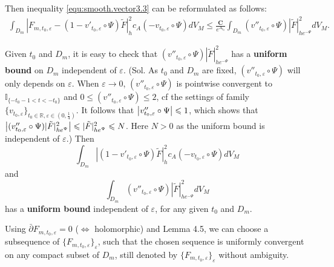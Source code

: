 Then inequality \ref{equ:smooth.vector3.3} can be reformulated
as follows:
\begin{equation}
\label{equ:smooth.vector3.5}
\begin{split}
\int_{D_m}|F_{m,t_{0},\varepsilon}-(1-v'_{t_{0},\varepsilon}\circ\Psi)
\tilde{F}|^{2}_{h}c_{A}(-v_{t_0,\varepsilon}\circ\Psi)dV_{M}
\leqslant\frac{\mathbf{C}}{e^{A_{t_0}}}\int_{D_m}(v''_{t_0,\varepsilon}\circ\Psi)|\tilde{F}|^{2}_{he^{-\Psi}}dV_{M}.
\end{split}
\end{equation}

{\color{purple} Given $t_0$ and $D_{m}$, it is easy to check that
$(v''_{t_0,\varepsilon}\circ\Psi)|\tilde{F}|^{2}_{he^{-\Psi}}$ has a
\textbf{uniform bound} on $D_{m}$ independent of $\varepsilon$. (Sol. As $t_0$ and $D_m$ are fixed, $(v''_{t_0,\varepsilon}\circ\Psi)$ will only depends on $\varepsilon$. When $\varepsilon\to 0$, $(v''_{t_0,\varepsilon}\circ\Psi)$ is pointwise convergent to $\mathbb{I}_{\{-t_0-1<t<-t_0\}}$ and $0\leqslant (v''_{t_0,\varepsilon}\circ\Psi)\leqslant 2$, cf the settings of family $\{v_{t_0,\varepsilon}\}_{t_0\in \mathbb{R},\varepsilon\in (0,\frac 14)}$. It follows that $\abs{v''_{t_0,\varepsilon}\circ\Psi}\leqslant 1$, which shows that $\abs{(v''_{t_0,\varepsilon}\circ\Psi)|\tilde{F}|^2_{he^\Psi}}\leqslant |\tilde{F}|^2_{he^\Psi}\leqslant N$. Here $N>0$ as the uniform bound is independent of $\varepsilon$.) Then
$$\int_{D_m}|(1-v'_{t_0,\varepsilon}\circ\Psi)\tilde{F}|^{2}_{h}c_{A}(-v_{t_0,\varepsilon}\circ\Psi)dV_{M}$$
and
$$\int_{D_m}(v''_{t_0,\varepsilon}\circ\Psi) |\tilde{F}|^{2}_{he^{-\Psi}}dV_{M}$$
has a \textbf{uniform bound} independent of $\varepsilon$, for any given
$t_0$ and $D_m$.}

Using $\bar\partial F_{m,t_{0},\varepsilon}=0$ ($\iff$ holomorphic) and Lemma
4.5, we can choose a subsequence of
$\{F_{m,t_0,\varepsilon}\}_{\varepsilon}$, such that the chosen
sequence is uniformly convergent on any compact subset of $D_m$,
still denoted by $\{F_{m,t_0,\varepsilon}\}_{\varepsilon}$ without
ambiguity.

